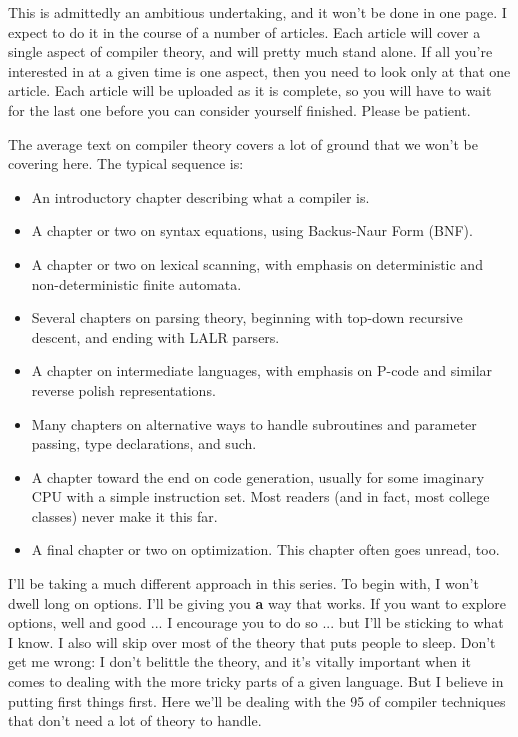 This is admittedly an ambitious undertaking, and it won't be done
in  one page.  I expect to do it in the course  of  a  number  of
articles.    Each  article will cover a single aspect of compiler
theory,  and  will  pretty  much  stand  alone.   If  all  you're
interested in at a given time is one  aspect,  then  you  need to
look only at that one article.  Each article will be  uploaded as
it  is complete, so you will have to wait for the last one before
you can consider yourself finished.  Please be patient.

The average text on  compiler  theory covers a lot of ground that
we won't be covering here.  The typical sequence is:

\begin{itemize}
\item An introductory chapter describing what a compiler is.
%
\item A chapter or two on syntax equations, using Backus-Naur Form
   (BNF).
%
\item A chapter or two on lexical scanning, with emphasis on
   deterministic and non-deterministic finite automata.
%
\item Several chapters on parsing theory, beginning with top-down
   recursive descent, and ending with LALR parsers.
\item A chapter on intermediate languages, with emphasis on P-code
   and similar reverse polish representations.
%
\item Many chapters on alternative ways to handle subroutines and
   parameter passing, type declarations, and such.
%
\item A chapter toward the end on code generation, usually for some
   imaginary CPU with a simple instruction set.  Most readers
   (and in fact, most college classes) never make it this far.
%
\item A final chapter or two on optimization. This chapter often
   goes unread, too.
\end{itemize}

I'll  be taking a much different approach in  this  series.    To
begin  with,  I  won't dwell long on options.  I'll be giving you
{\bfseries a} way that works.  If you want  to  explore  options,  well and
good ...  I  encourage  you  to do so ... but I'll be sticking to
what I know.   I also will skip over most of the theory that puts
people  to  sleep.  Don't get me  wrong:  I  don't  belittle  the
theory, and it's vitally important  when it comes to dealing with
the more tricky  parts  of  a  given  language.  But I believe in
putting first things first.    Here we'll be dealing with the 95%
of compiler techniques that don't need a lot of theory to handle.

